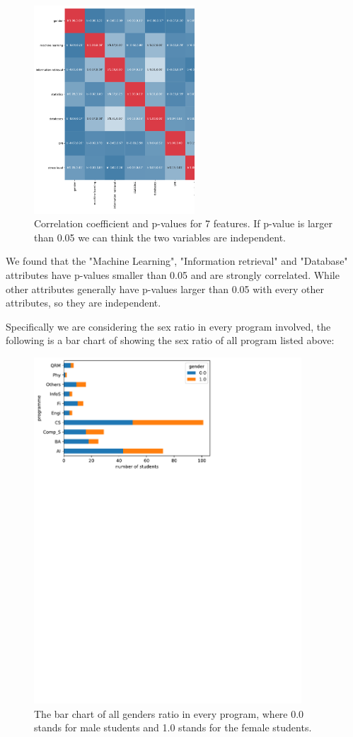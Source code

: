 \documentclass[runningheads]{llncs}
\begin{document}
\begin{figure}[h]
    \centering
    \includegraphics[width=6cm]{./images/corr_heatmap.pdf}
    \caption{Correlation coefficient and p-values for 7 features. If p-value is larger than 0.05 we can think the two variables are independent.}
    \label{fig:corr}
\end{figure}

We found that the "Machine Learning", "Information retrieval" and "Database" attributes have p-values smaller than 0.05 and are strongly correlated. While other attributes generally have p-values larger than 0.05 with every other attributes, so they are independent.

Specifically we are considering the sex ratio in every program involved, the following is a bar chart of showing the sex ratio of all program listed above:

\begin{figure}[h]
    \centering
    \includegraphics[width=10cm]{./images/genders.pdf}
    \caption{The bar chart of all genders ratio in every program, where 0.0 stands for male students and 1.0 stands for the female students.}
    \label{fig:gender}
\end{figure}
\end{document}

